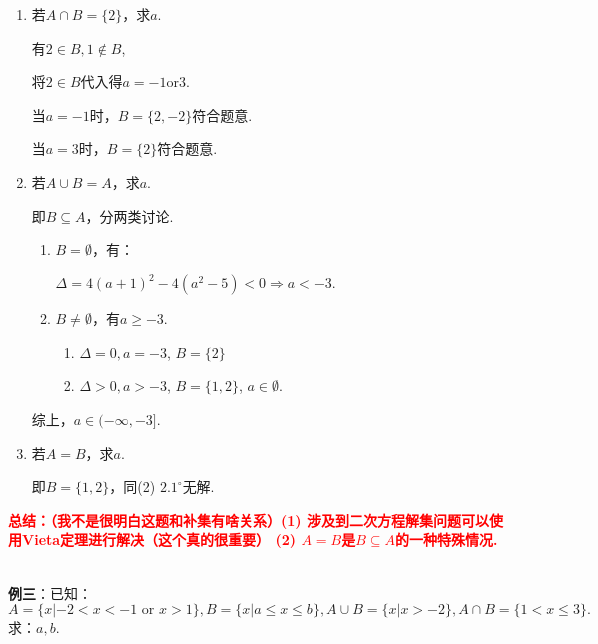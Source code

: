 \documentclass[8pt]{article}
\begin{document}
				\begin{enumerate}[label=(\arabic*)]
					\item 若$A\cap B=\{2\}$，求$a$.

						有$2\in B, 1\notin B$,

						将$2\in B$代入得$a=-1 \text{or} 3.$

						当$a=-1$时，$B=\{2, -2\}$符合题意.

						当$a=3$时，$B=\{2\}$符合题意.

					\item 若$A\cup B=A$，求$a$.

						即$B\subseteq A$，分两类讨论.

						\begin{enumerate}[label=$\arabic*^{\circ}$]
							\item $B=\emptyset$，有：

							$\Delta=4(a+1)^2-4(a^2-5)<0 \Rightarrow a<-3.$

							\item $B\neq\emptyset$，有$a\geq -3$.

							\begin{enumerate}[label=$2.\arabic*^{\circ}$]
								\item $\Delta = 0, a = -3$, $B=\{2\}$

								\item $\Delta > 0, a > -3$, $B=\{1,2\}$, $a\in\emptyset.$	

							\end{enumerate}

						\end{enumerate}

						综上，$a\in(-\infty, -3].$

					\item 若$A=B$，求$a$.

						即$B=\{1,2\}$，同(2) $2.1^{\circ}$无解.

				\end{enumerate}

				\textcolor{red}{\textbf{总结：（我不是很明白这题和补集有啥关系）(1) 涉及到二次方程解集问题可以使用Vieta定理进行解决（这个真的很重要） (2) $A=B$是$B\subseteq A$的一种特殊情况.}}

				~\\

				\textbf{例三}：已知：$A=\{x|-2<x<-1\text{ or } x>1\}, B=\{x|a\leq x\leq b\}, A\cup B=\{x|x>-2\}, A\cap B=\{1<x\leq 3\}.$求：$a, b$.
				~\\
\end{document}
